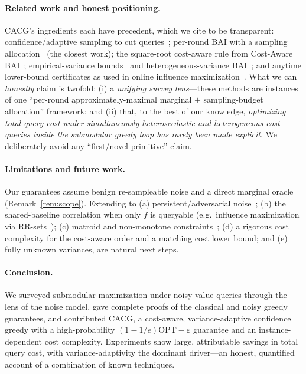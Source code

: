 \documentclass[11pt]{article}
\theoremstyle{plain}
\theoremstyle{definition}
\newcommand{\OPT}{\mathrm{OPT}}
\begin{document}
\paragraph{Related work and honest positioning.}
CACG's ingredients each have precedent, which we cite to be transparent:
confidence/adaptive sampling to cut queries~\cite{Singla2016,ChenXingCrawford2023};
per-round BAI with a sampling allocation~\cite{ChenCrawford2024} (the
closest work); the square-root cost-aware rule from Cost-Aware
BAI~\cite{Kanarios2024}; empirical-variance
bounds~\cite{MaurerPontil2009,Audibert2009} and heterogeneous-variance
BAI~\cite{SHAdaVar2023}; and anytime lower-bound certificates as used in
online influence maximization~\cite{TangTangXiaoYuan2018}. What we can
\emph{honestly} claim is twofold: (i) a \emph{unifying survey lens}---these
methods are instances of one ``per-round approximately-maximal marginal $+$
sampling-budget allocation'' framework; and (ii) that, to the best of our
knowledge, \emph{optimizing total query cost under simultaneously
heteroscedastic and heterogeneous-cost queries inside the submodular greedy
loop has rarely been made explicit}. We deliberately avoid any ``first/novel
primitive'' claim.

\paragraph{Limitations and future work.}
Our guarantees assume benign re-sampleable noise and a direct marginal
oracle (Remark~\ref{rem:scope}). Extending to (a) persistent/adversarial
noise~\cite{HassidimSinger2017,Bhawalkar2025}; (b) the shared-baseline
correlation when only $f$ is queryable (e.g.\ influence maximization via
RR-sets~\cite{Borgs2014,TangShiXiao2015}); (c) matroid and non-monotone
constraints~\cite{CCPV2011,BuchbinderFNS2015}; (d) a rigorous cost
complexity for the cost-aware order and a matching cost lower bound; and
(e) fully unknown variances, are natural next steps.

\paragraph{Conclusion.}
We surveyed submodular maximization under noisy value queries through the
lens of the noise model, gave complete proofs of the classical and noisy
greedy guarantees, and contributed CACG, a cost-aware, variance-adaptive
confidence greedy with a high-probability $(1-1/e)\OPT-\varepsilon$
guarantee and an instance-dependent cost complexity. Experiments show large,
attributable savings in total query cost, with variance-adaptivity the
dominant driver---an honest, quantified account of a combination of known
techniques.



\end{document}
